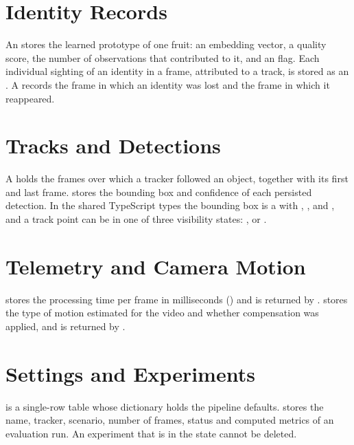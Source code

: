 \section{Identity Records}

An  stores the learned prototype of one fruit: an embedding vector, a quality score, the number of observations that contributed to it, and an  flag. Each individual sighting of an identity in a frame, attributed to a track, is stored as an . A  records the frame in which an identity was lost and the frame in which it reappeared.


\section{Tracks and Detections}

A  holds the frames over which a tracker followed an object, together with its first and last frame.  stores the bounding box and confidence of each persisted detection. In the shared TypeScript types the bounding box is a  with , ,  and , and a track point can be in one of three visibility states: ,  or .

\section{Telemetry and Camera Motion}

 stores the processing time per frame in milliseconds () and is returned by .  stores the type of motion estimated for the video and whether compensation was applied, and is returned by .

\section{Settings and Experiments}

 is a single-row table whose  dictionary holds the pipeline defaults.  stores the name, tracker, scenario, number of frames, status and computed metrics of an evaluation run. An experiment that is in the  state cannot be deleted.

